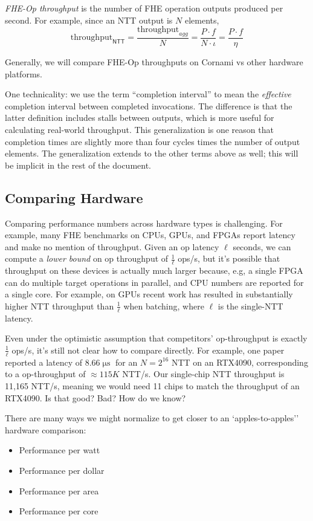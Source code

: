 \documentclass{article}
\DeclareMathOperator*{\us}{\mu\mathrm{s}}
\begin{document}
	\emph{FHE-Op throughput} is the number of FHE operation outputs produced per second. For example, since an NTT output is $N$ elements,	
	\[\mathrm{throughput}_{\mathsf{NTT}}=\frac{\mathrm{throughput}_{agg}}{N} = \frac{P\cdot f}{N\cdot \iota} = \frac{P\cdot f}{\eta}\]
	
	Generally, we will compare FHE-Op throughputs on Cornami vs other hardware platforms.
	
	One technicality: we use the term ``completion interval'' to mean the \emph{effective} completion interval between completed invocations. The difference is that the latter definition includes stalls between outputs, which is more useful for calculating real-world throughput. This generalization is one reason that completion times are slightly more than four cycles times the number of output elements. The generalization extends to the other terms above as well; this will be implicit in the rest of the document.
	
	\subsection{Comparing Hardware}
	Comparing performance numbers across hardware types is challenging. For example, many FHE benchmarks on CPUs, GPUs, and FPGAs report latency and make no mention of throughput. Given an op latency $\ell$ seconds, we can compute a \emph{lower bound} on op throughput of $\frac{1}{\ell}$ ops/s, but it's possible that throughput on these devices is actually much larger because, e.g, a single FPGA can do multiple target operations in parallel, and CPU numbers are reported for a single core. For example, on GPUs recent work has resulted in substantially higher NTT throughput than $\frac{1}{\ell}$ when batching, where $\ell$ is the single-NTT latency.
	
	Even under the optimistic assumption that competitors' op-throughput is exactly $\frac{1}{\ell}$ ops/s, it's still not clear how to compare directly. 
For example, one paper reported a latency of $8.66\us$ for an $N=2^{16}$ NTT on an RTX4090, corresponding to a op-throughput of $\approx 115K$ NTT/s. Our single-chip NTT throughput is 11,165 NTT/s, meaning we would need 11 chips to match the throughput of an RTX4090. Is that good? Bad? How do we know?
	
	There are many ways we might normalize to get closer to an `apples-to-apples'' hardware comparison:
	\begin{itemize}
		\item Performance per watt
		\item Performance per dollar
		\item Performance per area
		\item Performance per core
	\end{itemize}
	
\end{document}

